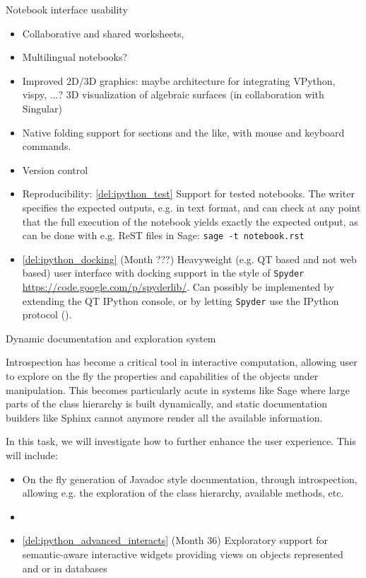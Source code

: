 \begin{Workpackage}{\thewpno}
\begin{task}{Notebook interface usability}
  \begin{itemize}
  \item Collaborative and shared worksheets,
  \item Multilingual notebooks?
  \item Improved 2D/3D graphics: maybe architecture for integrating
    VPython, vispy, ...? 3D visualization of algebraic surfaces (in
    collaboration with Singular)
  \item Native folding support for sections and the like, with mouse
    and keyboard commands.
  \item Version control
  \item Reproducibility: \ref{del:ipython_test} Support for tested
    notebooks. The writer specifies the expected outputs, e.g. in text
    format, and can check at any point that the full execution of the
    notebook yields exactly the expected output, as can be done with
    e.g. ReST files in Sage: \lstinline{sage -t notebook.rst}
  \item \ref{del:ipython_docking} (Month ???) Heavyweight (e.g. QT
    based and not web based) user interface with docking support in
    the style of \texttt{Spyder}
    \url{https://code.google.com/p/spyderlib/}. Can possibly be
    implemented by extending the QT IPython console, or by letting
    \texttt{Spyder} use the IPython protocol ().
  \end{itemize}
\end{task}

\begin{task}{Dynamic documentation and exploration system}

  Introspection has become a critical tool in interactive computation,
  allowing user to explore on the fly the properties and capabilities
  of the objects under manipulation. This becomes particularly acute
  in systems like Sage where large parts of the class hierarchy is
  built dynamically, and static documentation builders like Sphinx
  cannot anymore render all the available information.

  In this task, we will investigate how to further enhance the user
  experience. This will include:

  \begin{itemize}
  \item On the fly generation of Javadoc style documentation, through
    introspection, allowing e.g. the exploration of the class
    hierarchy, available methods, etc.
  \item {}
  \item \ref{del:ipython_advanced_interacts} (Month 36) Exploratory
    support for semantic-aware interactive widgets providing views on
    objects represented and or in databases


\end{itemize}
\end{task}
\end{Workpackage}
